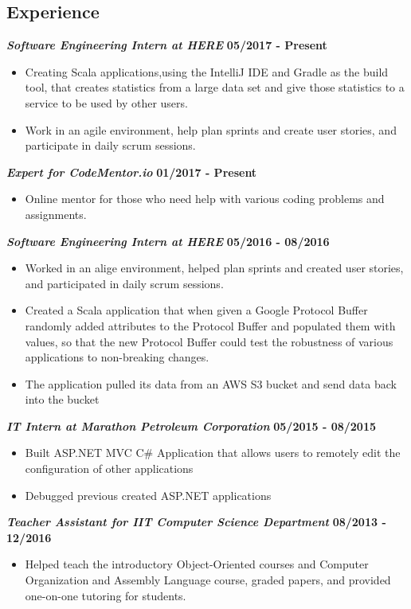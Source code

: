 \documentclass[margin=1in, 10pt]{res}
\begin{document}
\begin{resume}
\section{Experience}
	\textbf{\textit{Software Engineering Intern at HERE}}
	\hfill{\bf 05/2017 - Present}
	\begin{itemize}
		\item Creating Scala applications,using the IntelliJ IDE and Gradle as the build tool, that creates statistics from a large data set and give those statistics to a service to be used by other users. 
\item Work in an agile environment, help plan sprints and create user stories, and participate in daily scrum sessions. 
	\end{itemize}
\textbf{\textit{Expert for CodeMentor.io}}
	\hfill{\bf 01/2017 - Present}
	\begin{itemize}
		\item Online mentor for those who need help with various coding problems and assignments. 
	\end{itemize}
	\textbf{\textit{Software Engineering Intern at HERE}}
	\hfill {\bf 05/2016 - 08/2016}
	\begin{itemize}
	    \setlength\itemsep{0em}
	\item Worked in an alige environment, helped plan sprints and created user stories, and participated in daily scrum sessions. 
	  \item Created a Scala application that when given a Google Protocol Buffer randomly added attributes to the Protocol Buffer 
 and populated them with values, so that the new Protocol Buffer could test the robustness of various applications to non-breaking changes.
	\item The application pulled its data from an AWS S3 bucket and send data back into the bucket
	\end{itemize}  
	\textbf{\textit{IT Intern at Marathon Petroleum Corporation}} \hfill {\bf 05/2015 - 08/2015}
	\begin{itemize}
  \setlength\itemsep{0em}
	  \item Built ASP.NET MVC C\# Application that allows users to remotely edit the configuration of other applications 
	  \item Debugged previous created ASP.NET applications
\end{itemize}

	\textbf{\textit{Teacher Assistant for IIT Computer Science Department}} 
	\hfill {\bf 08/2013 - 12/2016}
	\begin{itemize}
	  \item Helped teach the introductory Object-Oriented courses and Computer Organization and Assembly Language course, graded papers, and provided one-on-one tutoring for students. 
	\end{itemize}
	

\end{resume}
\end{document}
